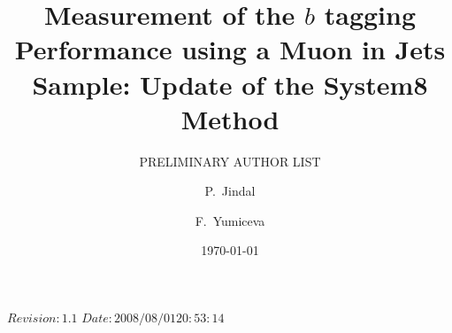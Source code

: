\RCS$Revision: 1.1 $
\RCS$Date: 2008/08/01 20:53:14 $

 
\def\bb{$b\overline{b}\;$}
\def\cc{$c\overline{c}\;$}
\def\ttbar{$t\overline{t}\;$}
\def\mttbar{$m_{t\overline{t}}\;$}
\def\Zp{${Z'}\;$}
\def\ddZ{$\mathrm{d}\overline{\mathrm{d}}$}
\def\ss{$\mathrm{s}\overline{\mathrm{s}}\;$}
\def\ssZ{$\mathrm{s}\overline{\mathrm{s}}$}
\def\zqq{$\mathrm{Z} \rightarrow \mathrm{q}\overline{\mathrm{q}}\;$}
\def\zcc{$\mathrm{Z} \rightarrow \mathrm{c}\overline{\mathrm{c}}\;$}
\def\zbb{$\mathrm{Z} \rightarrow \mathrm{b}\overline{\mathrm{b}}\;$}
\def\zuuZ{$\mathrm{Z} \rightarrow \mathrm{u}\overline{\mathrm{u}}$}
\def\gevc{~GeV/$c\;$}
\def\gevcc{~GeV/$c^{2}\;$}
\def\mum{~$\mu$m$\;$}
\def\pt{$p_T\;$}
\def\ptZ{$p_T$}
\def\Et{$E_T\;$}
\def\EtZ{$E_T$}
\def\ip{$IP\;$}
\def\ipZ{$IP$}
\def\dca{$dca\;$}
\def\prob{${\cal P}_{jet}\;$}
\def\probZ{${\cal P}_{jet}$}
\def\dr{$\Delta R\;$}
\def\pscat{$p_{scat}\;$}
\def\pscatZ{$p_{scat}$}
\def\sip{${\cal S}_{IP}\;$}
\def\ptrel{$p_{Trel}\;$}
\def\tag{${\cal P}_{jet}^+<$}

\title{\bf Measurement of the $b$ tagging Performance using a Muon in Jets Sample: Update of the System8 Method}

\author[fnal]{PRELIMINARY AUTHOR LIST}
\author[purdue]{P.~Jindal}
\author[fnal]{F.~Yumiceva}
\address[fnal]{Fermi National Accelerator Laboratory, Batavia, Illinois USA}  
\address[purdue]{Purdue University Calumet, Hammond, Indiana, USA}
\date{\today}
  



\maketitle %

